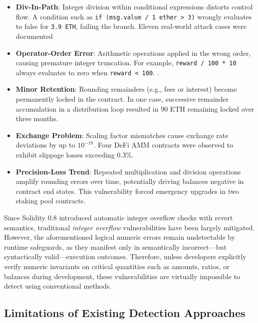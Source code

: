 \documentclass[pdflatex,sn-basic]{sn-jnl}%
\theoremstyle{thmstyleone}%
\theoremstyle{thmstyletwo}%
\theoremstyle{thmstylethree}%
\begin{document}
\begin{itemize}
    \item \textbf{Div-In-Path}: Integer division within conditional expressions distorts control flow.  
    A condition such as \texttt{if (msg.value / 1 ether > 3)} wrongly evaluates to false for \texttt{3.9 ETH}, failing the branch. Eleven real-world attack cases were documented
    
    \item \textbf{Operator-Order Error}: Arithmetic operations applied in the wrong order, causing premature integer truncation.  
    For example, \texttt{reward / 100 * 10} always evaluates to zero when \texttt{reward < 100}.    
    .
    
    \item \textbf{Minor Retention}: Rounding remainders (e.g., fees or interest) become permanently locked in the contract.  
    In one case, successive remainder accumulation in a distribution loop resulted in 90 ETH remaining locked over three months.
    
    \item \textbf{Exchange Problem}: Scaling factor mismatches cause exchange rate deviations by up to \(10^{-18}\).  
    Four DeFi AMM contracts were observed to exhibit slippage losses exceeding 0.3\%.
    
    \item \textbf{Precision-Loss Trend}: Repeated multiplication and division operations amplify rounding errors over time, potentially driving balances negative in contract end states.  
    This vulnerability forced emergency upgrades in two staking pool contracts.
\end{itemize}

Since Solidity 0.8 introduced automatic integer overflow checks with revert semantics, traditional \textit{integer overflow} vulnerabilities have been largely mitigated. However, the aforementioned logical numeric errors remain undetectable by runtime safeguards, as they manifest only in semantically incorrect—but syntactically valid—execution outcomes. Therefore, unless developers explicitly verify numeric invariants on critical quantities such as amounts, ratios, or balances during development, these vulnerabilities are virtually impossible to detect using conventional methods.


\subsection{Limitations of Existing Detection Approaches}
\end{document}
